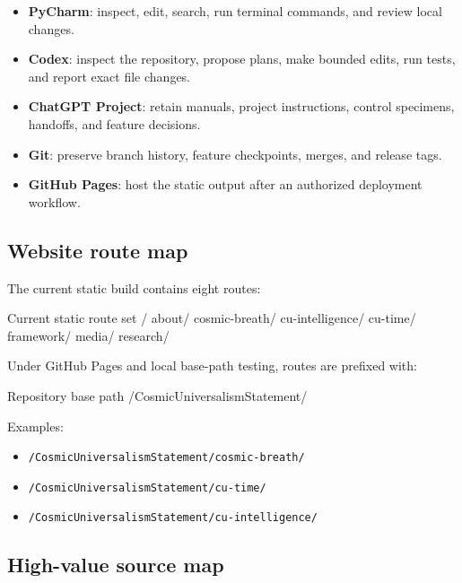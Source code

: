 \documentclass[11pt,letterpaper]{article}
\newcommand{\filepath}[1]{\nolinkurl{#1}}
\begin{document}
\begin{itemize}
    \item \textbf{PyCharm}: inspect, edit, search, run terminal commands, and
          review local changes.
    \item \textbf{Codex}: inspect the repository, propose plans, make bounded
          edits, run tests, and report exact file changes.
    \item \textbf{ChatGPT Project}: retain manuals, project instructions,
          control specimens, handoffs, and feature decisions.
    \item \textbf{Git}: preserve branch history, feature checkpoints, merges,
          and release tags.
    \item \textbf{GitHub Pages}: host the static output after an authorized
          deployment workflow.
\end{itemize}

\subsection{Website route map}

The current static build contains eight routes:

\begin{codebox}{Current static route set}
/
about/
cosmic-breath/
cu-intelligence/
cu-time/
framework/
media/
research/
\end{codebox}

Under GitHub Pages and local base-path testing, routes are prefixed with:

\begin{codebox}{Repository base path}
/CosmicUniversalismStatement/
\end{codebox}

Examples:

\begin{itemize}
    \item \filepath{/CosmicUniversalismStatement/cosmic-breath/}
    \item \filepath{/CosmicUniversalismStatement/cu-time/}
    \item \filepath{/CosmicUniversalismStatement/cu-intelligence/}
\end{itemize}

\subsection{High-value source map}
\end{document}
